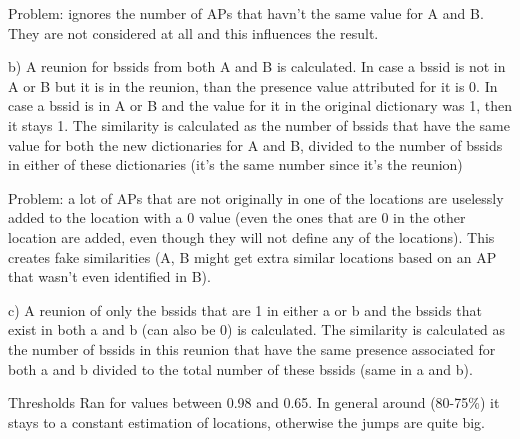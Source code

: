 Problem: ignores the number of APs that havn’t the same value for A and B. They are not considered at all and this influences the result.


b) A reunion for bssids from both A and B is calculated. In case a bssid is not in A or B but it is in the reunion, than the presence value attributed for it is 0. In case a bssid is in A or B and the value for it in the original dictionary was 1, then it stays 1. The similarity is calculated as the number of bssids that have the same value for both the new dictionaries for A and B, divided to the number of bssids in either of these dictionaries (it's the same number since it's the reunion)

Problem: a lot of APs that are not originally in one of the locations are uselessly added to the location with a 0 value (even the ones that are 0 in the other location are added, even though they will not define any of the locations). This creates fake similarities (A, B might get extra similar locations based on an AP that wasn’t even identified in B).

c) A reunion of only the bssids that are 1 in either a or b and the bssids that exist in both a and b (can also be 0) is calculated. The similarity is calculated as the number of bssids in this reunion that have the same presence associated for both a and b divided to the total number of these bssids (same in a and b).

Thresholds
Ran for values between 0.98 and 0.65. In general around (80-75\%) it stays to a
constant estimation of locations, otherwise the jumps are quite big.
